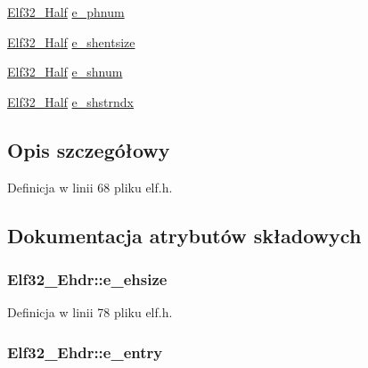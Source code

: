 \begin{DoxyCompactItemize}
\item 
\hyperlink{elf_8h_a2ff0787d7d1bae0f251192806a2974ca}{Elf32\-\_\-\-Half} \hyperlink{struct_elf32___ehdr_a360898812db1655f8cb8258780d9df5b}{e\-\_\-phnum}
\item 
\hyperlink{elf_8h_a2ff0787d7d1bae0f251192806a2974ca}{Elf32\-\_\-\-Half} \hyperlink{struct_elf32___ehdr_ab53c709a841960e499da68e2316ed428}{e\-\_\-shentsize}
\item 
\hyperlink{elf_8h_a2ff0787d7d1bae0f251192806a2974ca}{Elf32\-\_\-\-Half} \hyperlink{struct_elf32___ehdr_a11249bd7e61642742a68a3e7f69ac721}{e\-\_\-shnum}
\item 
\hyperlink{elf_8h_a2ff0787d7d1bae0f251192806a2974ca}{Elf32\-\_\-\-Half} \hyperlink{struct_elf32___ehdr_a3b3070ccd7d971e8cb6ea58d4c6fab09}{e\-\_\-shstrndx}
\end{DoxyCompactItemize}


\subsection{Opis szczegółowy}


Definicja w linii 68 pliku elf.\-h.



\subsection{Dokumentacja atrybutów składowych}
\hypertarget{struct_elf32___ehdr_a04c658023e50479eed64f6d1b00a2504}{
\subsubsection[{e\-\_\-ehsize}]{ Elf32\-\_\-\-Ehdr\-::e\-\_\-ehsize}}\label{struct_elf32___ehdr_a04c658023e50479eed64f6d1b00a2504}


Definicja w linii 78 pliku elf.\-h.

\hypertarget{struct_elf32___ehdr_ab8a982696048d807017919b7d0145482}{
\subsubsection[{e\-\_\-entry}]{ Elf32\-\_\-\-Ehdr\-::e\-\_\-entry}}\label{struct_elf32___ehdr_ab8a982696048d807017919b7d0145482}



